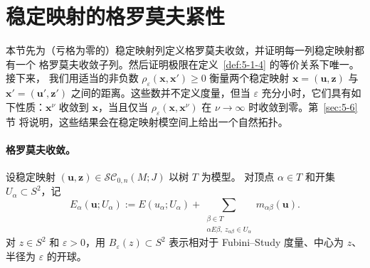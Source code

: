 
\section{稳定映射的格罗莫夫紧性}\label{sec:5-5}

本节先为（亏格为零的）稳定映射列定义格罗莫夫收敛，并证明每一列稳定映射都有一个
格罗莫夫收敛子列。然后证明极限在定义~\ref{def:5-1-4} 的等价关系下唯一。接下来，
我们用适当的非负数
$\rho_\varepsilon(\mathbf x,\mathbf x')\ge0$
衡量两个稳定映射
$\mathbf x=(\mathbf u,\mathbf z)$ 与
$\mathbf x'=(\mathbf u',\mathbf z')$ 之间的距离。这些数并不定义度量，但当
$\varepsilon$ 充分小时，它们具有如下性质：$\mathbf x^\nu$ 收敛到 $\mathbf x$，当且仅当
$\rho_\varepsilon(\mathbf x,\mathbf x^\nu)$ 在 $\nu\to\infty$ 时收敛到零。第~\ref{sec:5-6}节
将说明，这些结果会在稳定映射模空间上给出一个自然拓扑。

\paragraph{格罗莫夫收敛。}
设稳定映射 $(\mathbf u,\mathbf z)\in\mathcal{SC}_{0,n}(M;J)$ 以树 $T$ 为模型。
对顶点 $\alpha\in T$ 和开集 $U_\alpha\subset S^2$，记
\[
  E_\alpha(\mathbf u;U_\alpha)
  :=E(u_\alpha;U_\alpha)
    +\sum_{\substack{\beta\in T\\
                     \alpha E\beta,\ z_{\alpha\beta}\in U_\alpha}}
      m_{\alpha\beta}(\mathbf u).
\]
对 $z\in S^2$ 和 $\varepsilon>0$，用 $B_\varepsilon(z)\subset S^2$ 表示相对于
Fubini--Study 度量、中心为 $z$、半径为 $\varepsilon$ 的开球。

